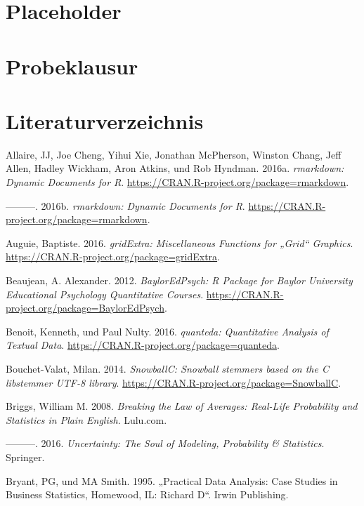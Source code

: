 \documentclass[12pt,ngerman,]{book}
\begin{document}
\chapter{Placeholder}\label{placeholder-1}

\chapter{Probeklausur}\label{probeklausur}

\chapter{Literaturverzeichnis}\label{literaturverzeichnis}

\hypertarget{refs}{}
\hypertarget{ref-R-rmarkdown}{}
Allaire, JJ, Joe Cheng, Yihui Xie, Jonathan McPherson, Winston Chang,
Jeff Allen, Hadley Wickham, Aron Atkins, und Rob Hyndman. 2016a.
\emph{rmarkdown: Dynamic Documents for R}.
\url{https://CRAN.R-project.org/package=rmarkdown}.

\hypertarget{ref-rmarkdown}{}
---------. 2016b. \emph{rmarkdown: Dynamic Documents for R}.
\url{https://CRAN.R-project.org/package=rmarkdown}.

\hypertarget{ref-R-gridExtra}{}
Auguie, Baptiste. 2016. \emph{gridExtra: Miscellaneous Functions for
„Grid`` Graphics}. \url{https://CRAN.R-project.org/package=gridExtra}.

\hypertarget{ref-R-BaylorEdPsych}{}
Beaujean, A. Alexander. 2012. \emph{BaylorEdPsych: R Package for Baylor
University Educational Psychology Quantitative Courses}.
\url{https://CRAN.R-project.org/package=BaylorEdPsych}.

\hypertarget{ref-R-quanteda}{}
Benoit, Kenneth, und Paul Nulty. 2016. \emph{quanteda: Quantitative
Analysis of Textual Data}.
\url{https://CRAN.R-project.org/package=quanteda}.

\hypertarget{ref-R-SnowballC}{}
Bouchet-Valat, Milan. 2014. \emph{SnowballC: Snowball stemmers based on
the C libstemmer UTF-8 library}.
\url{https://CRAN.R-project.org/package=SnowballC}.

\hypertarget{ref-breaking}{}
Briggs, William M. 2008. \emph{Breaking the Law of Averages: Real-Life
Probability and Statistics in Plain English}. Lulu.com.

\hypertarget{ref-uncertainty}{}
---------. 2016. \emph{Uncertainty: The Soul of Modeling, Probability \&
Statistics}. Springer.

\hypertarget{ref-bryant1995practical}{}
Bryant, PG, und MA Smith. 1995. „Practical Data Analysis: Case Studies
in Business Statistics, Homewood, IL: Richard D``. Irwin Publishing.
\end{document}

